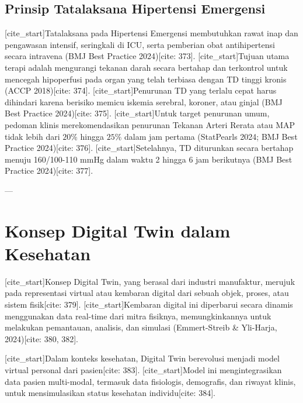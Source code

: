 \subsection{Prinsip Tatalaksana Hipertensi Emergensi}
[cite_start]Tatalaksana pada Hipertensi Emergensi membutuhkan rawat inap dan pengawasan intensif, seringkali di ICU, serta pemberian obat antihipertensi secara intravena (BMJ Best Practice 2024)[cite: 373]. [cite_start]Tujuan utama terapi adalah mengurangi tekanan darah secara bertahap dan terkontrol untuk mencegah hipoperfusi pada organ yang telah terbiasa dengan TD tinggi kronis (ACCP 2018)[cite: 374]. [cite_start]Penurunan TD yang terlalu cepat harus dihindari karena berisiko memicu iskemia serebral, koroner, atau ginjal (BMJ Best Practice 2024)[cite: 375]. [cite_start]Untuk target penurunan umum, pedoman klinis merekomendasikan penurunan Tekanan Arteri Rerata atau MAP tidak lebih dari $20\%$ hingga $25\%$ dalam jam pertama (StatPearls 2024; BMJ Best Practice 2024)[cite: 376]. [cite_start]Setelahnya, TD diturunkan secara bertahap menuju 160/100-110 mmHg dalam waktu 2 hingga 6 jam berikutnya (BMJ Best Practice 2024)[cite: 377].

---
\section{Konsep Digital Twin dalam Kesehatan}
[cite_start]Konsep Digital Twin, yang berasal dari industri manufaktur, merujuk pada representasi virtual atau kembaran digital dari sebuah objek, proses, atau sistem fisik[cite: 379]. [cite_start]Kembaran digital ini diperbarui secara dinamis menggunakan data real-time dari mitra fisiknya, memungkinkannya untuk melakukan pemantauan, analisis, dan simulasi (Emmert-Streib \& Yli-Harja, 2024)[cite: 380, 382].

[cite_start]Dalam konteks kesehatan, Digital Twin berevolusi menjadi model virtual personal dari pasien[cite: 383]. [cite_start]Model ini mengintegrasikan data pasien multi-modal, termasuk data fisiologis, demografis, dan riwayat klinis, untuk mensimulasikan status kesehatan individu[cite: 384].

